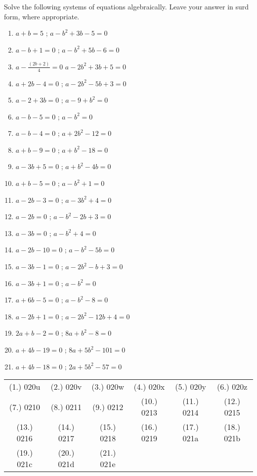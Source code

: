\begin{eocexercises}{}
Solve the following systems of equations algebraically. Leave your answer in
surd form, where appropriate.

\begin{enumerate}[label=\textbf{\arabic*}.]
\item $a + b = 5$ ; $a-b^2 + 3b - 5 = 0$
\item $a - b + 1=0$ ; $a-b^2 + 5b - 6 =0$
\item $a-\frac{(2b + 2)}{4} = 0$  $a-2b^2 + 3b + 5 = 0$
\item $a+2b -4 = 0$ ; $a-2b^2 - 5b + 3 = 0$
\item $a-2+3b=0$ ; $a-9+b^2=0$
\item $a-b-5=0$ ; $a-b^2=0$
\item $a-b-4=0$ ; $a+2b^2-12=0$
\item $a+b-9=0$ ; $a+b^2-18=0$
\item $a-3b+5=0$ ; $a+b^2-4b=0$
\item $a+b-5=0 $ ; $a-b^2+1=0$
\item $a-2b-3=0 $ ; $a-3b^2+4=0$
\item $a-2b=0 $ ; $a-b^2-2b+3=0$
\item $a-3b=0$ ; $a-b^2+4=0$
\item $a-2b-10=0$ ; $a-b^2-5b=0$
\item $a-3b-1=0$ ; $a-2b^2-b+3=0$
\item $a-3b+1=0$ ; $a-b^2=0$
\item $a+6b-5=0$ ; $a-b^2-8=0$
\item $a-2b+1=0$ ; $a-2b^2-12b+4=0$
\item $2a+b-2=0$ ; $8a+b^2-8=0$
\item $a+4b-19=0$ ; $8a+5b^2-101=0$
\item $a+4b-18=0$ ; $2a+5b^2-57=0$
\end{enumerate}


\par \practiceinfo
\par \begin{tabular}[h]{cccccc}
(1.) 020u	&
(2.) 020v	&
(3.) 020w	&
(4.) 020x	&
(5.) 020y	&
(6.) 020z	\\ %
(7.) 0210	&
(8.) 0211	&
(9.) 0212	&
(10.) 0213	&
(11.) 0214	&
(12.) 0215	\\ %
(13.) 0216	&
(14.) 0217	&
(15.) 0218	&
(16.) 0219	&
(17.) 021a	&
(18.) 021b	\\ %
(19.) 021c	&
(20.) 021d	&
(21.) 021e	&

\end{tabular}
\end{eocexercises}




